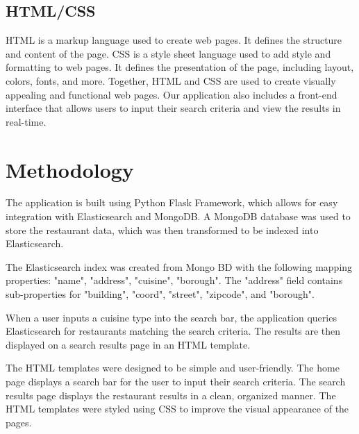 \documentclass[12pt]{article}
\begin{document}
\subsection{HTML/CSS}
HTML is a markup language used to create web pages. It defines the structure and content of the page. CSS is a style sheet language used to add style and formatting to web pages. It defines the presentation of the page, including layout, colors, fonts, and more. Together, HTML and CSS are used to create visually appealing and functional web pages. Our application also includes a front-end interface that allows users to input their search criteria and view the results in real-time.


\section{Methodology}
The application is built using Python Flask Framework, which allows for easy integration with Elasticsearch and MongoDB. A MongoDB database was used to store the restaurant data, which was then transformed to be indexed into Elasticsearch.

The Elasticsearch index was created from Mongo BD with the following mapping properties: "name", "address", "cuisine", "borough". The "address" field contains sub-properties for "building", "coord", "street", "zipcode", and "borough".

When a user inputs a cuisine type into the search bar, the application queries Elasticsearch for restaurants matching the search criteria. The results are then displayed on a search results page in an HTML template.

The HTML templates were designed to be simple and user-friendly. The home page displays a search bar for the user to input their search criteria. The search results page displays the restaurant results in a clean, organized manner. The HTML templates were styled using CSS to improve the visual appearance of the pages.
\end{document}

